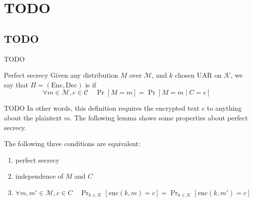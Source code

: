 \documentclass[a4paper, 12pt]{report}
\institute{\curlyquotes{\hspace{0.25mm}Sapienza} Università di Roma}
\subtitle{Appunti integrati con il libro \book}
\author{\textit{Autore}\\\authorName}
\institute{\curlyquotes{\hspace{0.25mm}Sapienza} University of Rome}
\subtitle{Lecture notes integrated with the book \book}
\author{\textit{Author}\\\authorName}
\title{\courseName}
\date{\today}
\begin{document}
\maketitle

{
	\hypersetup{allcolors=black}

	\romantableofcontents
}

\introduction


\chapter{TODO}

\section{TODO}

TODO 

\begin{frameddefn}{Perfect secrecy}
	Given any distribution $M$ over $\mathcal M$, and $k$ chosen UAR on $\mathcal K$, we say that $\Pi = (\mathrm{Enc}, \mathrm{Dec})$ is  if $$\forall m \in \mathcal M, c \in \mathcal C \quad \Pr[M = m] = \Pr[M = m \mid C = c]$$
\end{frameddefn}

TODO  In other words, this definition requires the encrypted text $c$ to  anything about the plaintext $m$. The following lemma shows some properties about perfect secrecy.

\begin{framedlem}{}
	The following three conditions are equivalent:

	\begin{enumerate}
		\item perfect secrecy
		\item independence of $M$ and $C$
		\item $\forall m, m' \in \mathcal M, c \in C \quad \Pr_{k \in \mathcal K}[\mathrm{enc}(k, m) = c] = \Pr_{k \in \mathcal K}[\mathrm{enc}(k, m') = c]$
	\end{enumerate}
\end{framedlem}
\end{document}
